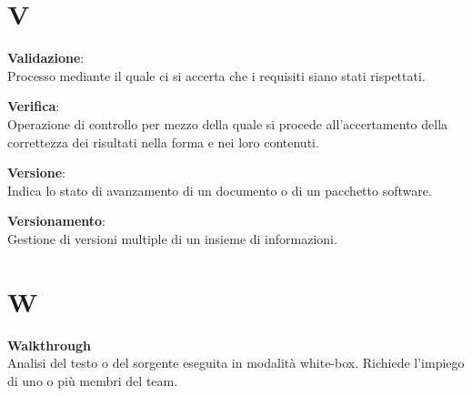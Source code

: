 \documentclass[a4paper, oneside, openany, dvipsnames, table]{article}
\begin{document}
\newpage
\section{V}
\textbf{Validazione}:\\	Processo mediante il quale ci si accerta che i requisiti siano stati rispettati.

\textbf{Verifica}:\\	Operazione di controllo per mezzo della quale si procede all'accertamento della correttezza dei risultati nella forma e nei loro contenuti.

\textbf{Versione}:\\ Indica lo stato di avanzamento di un documento o di un pacchetto software.

\textbf{Versionamento}:\\	Gestione di versioni multiple di un insieme di informazioni.

\newpage
\section{W}
\textbf{Walkthrough}\\
Analisi del testo o del sorgente eseguita in modalità white-box. Richiede l'impiego di uno o più membri del team.
\end{document}
